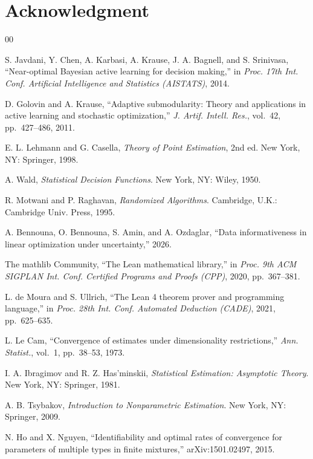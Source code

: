 \documentclass[conference]{IEEEtran}
\theoremstyle{definition}
\begin{document}
\section*{Acknowledgment}

\begin{thebibliography}{00}

 S. Javdani, Y. Chen, A. Karbasi, A. Krause, J. A. Bagnell, and
S. Srinivasa, ``Near-optimal Bayesian active learning for decision making,'' in
\emph{Proc. 17th Int. Conf. Artificial Intelligence and Statistics (AISTATS)}, 2014.

 D. Golovin and A. Krause, ``Adaptive submodularity: Theory and
applications in active learning and stochastic optimization,'' \emph{J. Artif. Intell. Res.},
vol.~42, pp.~427--486, 2011.

 E. L. Lehmann and G. Casella, \emph{Theory of Point Estimation},
2nd ed. New York, NY: Springer, 1998.

 A. Wald, \emph{Statistical Decision Functions}. New York, NY: Wiley, 1950.

 R. Motwani and P. Raghavan, \emph{Randomized Algorithms}. Cambridge,
U.K.: Cambridge Univ. Press, 1995.

 A. Bennouna, O. Bennouna, S. Amin, and A. Ozdaglar, ``Data
informativeness in linear optimization under uncertainty,'' 2026.

 The mathlib Community, ``The Lean mathematical library,'' in
\emph{Proc. 9th ACM SIGPLAN Int. Conf. Certified Programs and Proofs (CPP)}, 2020,
pp.~367--381.

 L. de Moura and S. Ullrich, ``The Lean 4 theorem prover and
programming language,'' in \emph{Proc. 28th Int. Conf. Automated Deduction (CADE)}, 2021,
pp.~625--635.

 L. Le Cam, ``Convergence of estimates under dimensionality
restrictions,'' \emph{Ann. Statist.}, vol.~1, pp.~38--53, 1973.

 I. A. Ibragimov and R. Z. Has'minskii, \emph{Statistical Estimation:
Asymptotic Theory}. New York, NY: Springer, 1981.

 A. B. Tsybakov, \emph{Introduction to Nonparametric Estimation}.
New York, NY: Springer, 2009.

 N. Ho and X. Nguyen, ``Identifiability and optimal rates of convergence
for parameters of multiple types in finite mixtures,'' arXiv:1501.02497, 2015.


\end{thebibliography}
\end{document}
